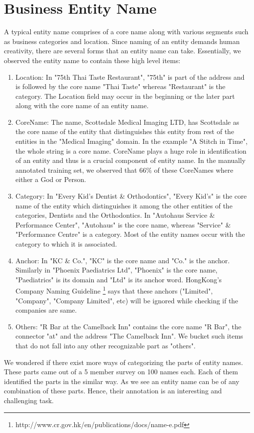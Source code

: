 \documentclass{acm_proc_article-sp}
\begin{document}
\section{Business Entity Name}
A typical entity name comprises of a core name along with various segments such as business categories and location. Since naming of an entity demands human creativity, there are several forms that an entity name can take. Essentially, we observed the entity name to contain these high level items:
\begin{enumerate}

\item Location: In "75th Thai Taste Restaurant", "75th" is part of the address and is followed by the core name "Thai Taste" whereas "Restaurant" is the category. The Location field may occur in the beginning or the later part along with the core name of an entity name.
\item CoreName:  The name, Scottsdale Medical Imaging LTD, has Scottsdale as the core name of the entity that distinguishes this entity from rest of the entities in the "Medical Imaging" domain. In the example "A Stitch in Time", the whole string is a core name. CoreName plays a huge role in identification of an entity and thus is a crucial component of entity name. In the manually annotated training set, we observed that 66\% of these CoreNames where either a God or Person.
\item Category: In "Every Kid's Dentist \& Orthodontics", "Every Kid's" is the core name of the entity which distinguishes it among the other entities of the categories, Dentists and the Orthodontics. In "Autohaus Service \& Performance Center", "Autohaus" is the core name, whereas "Service" \& "Performance Centre" is a category. Most of the entity names occur with the category to which it is associated.
\item Anchor: In "KC \& Co.", "KC" is the core name and "Co." is the anchor. Similarly in "Phoenix Paediatrics Ltd", "Phoenix" is the core name, "Paediatrics" is its domain and "Ltd" is its anchor word. HongKong's Company Naming Guideline \footnote{http://www.cr.gov.hk/en/publications/docs/name-e.pdf} says that these anchors ("Limited", "Company", "Company Limited", etc) will be ignored while checking if the companies are same.
\item Others: "R Bar at the Camelback Inn" contains the core name "R Bar", the connector "at" and the address "The Camelback Inn". We bucket such items that do not fall into any other recognizable part as "others".
\end{enumerate}
We wondered if there exist more ways of categorizing the parts of entity names. These parts came out of a 5 member survey on 100 names each. Each of them identified the parts in the similar way. As we see an entity name can be of any combination of these parts. Hence, their annotation is an interesting and challenging task.
\end{document}
